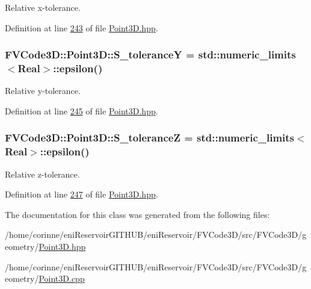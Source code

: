 Relative x-\/tolerance. 



Definition at line \hyperlink{Point3D_8hpp_source_l00243}{243} of file \hyperlink{Point3D_8hpp_source}{Point3\+D.\+hpp}.

\subsubsection[{\texorpdfstring{S\+\_\+toleranceY}{S_toleranceY}}]{ F\+V\+Code3\+D\+::\+Point3\+D\+::\+S\+\_\+toleranceY = std\+::numeric\+\_\+limits$<${\bf Real}$>$\+::epsilon()\hspace{0.3cm}{\ttfamily [static]}}\hypertarget{classFVCode3D_1_1Point3D_a1ec72cecf8486e2a9433093ac3b0cc2c}{}\label{classFVCode3D_1_1Point3D_a1ec72cecf8486e2a9433093ac3b0cc2c}


Relative y-\/tolerance. 



Definition at line \hyperlink{Point3D_8hpp_source_l00245}{245} of file \hyperlink{Point3D_8hpp_source}{Point3\+D.\+hpp}.

\subsubsection[{\texorpdfstring{S\+\_\+toleranceZ}{S_toleranceZ}}]{ F\+V\+Code3\+D\+::\+Point3\+D\+::\+S\+\_\+toleranceZ = std\+::numeric\+\_\+limits$<${\bf Real}$>$\+::epsilon()\hspace{0.3cm}{\ttfamily [static]}}\hypertarget{classFVCode3D_1_1Point3D_a180a0f561aae1274ee37b0ce334db956}{}\label{classFVCode3D_1_1Point3D_a180a0f561aae1274ee37b0ce334db956}


Relative z-\/tolerance. 



Definition at line \hyperlink{Point3D_8hpp_source_l00247}{247} of file \hyperlink{Point3D_8hpp_source}{Point3\+D.\+hpp}.



The documentation for this class was generated from the following files\+:\begin{DoxyCompactItemize}
\item 
/home/corinne/eni\+Reservoir\+G\+I\+T\+H\+U\+B/eni\+Reservoir/\+F\+V\+Code3\+D/src/\+F\+V\+Code3\+D/geometry/\hyperlink{Point3D_8hpp}{Point3\+D.\+hpp}\item 
/home/corinne/eni\+Reservoir\+G\+I\+T\+H\+U\+B/eni\+Reservoir/\+F\+V\+Code3\+D/src/\+F\+V\+Code3\+D/geometry/\hyperlink{Point3D_8cpp}{Point3\+D.\+cpp}\end{DoxyCompactItemize}
